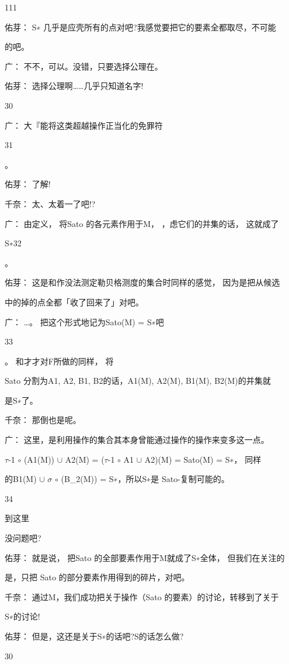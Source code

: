 111\par
佑芽： S∗ 几乎是应壳所有的点对吧?我感觉要把它的要素全都取尽，不可能\par
的吧。\par
广： 不不，可以。没错，只要选择公理在。\par
佑芽： 选择公理啊……几乎只知道名字!\par
30\par
广： 大『能将这类超越操作正当化的免罪符\par
31\par
。\par
佑芽： 了解!\par
千奈： 太、太着一了吧!?\par
广： 由定义， 将Sato 的各元素作用于M， ，虑它们的并集的话， 这就成了\par
S∗32\par
。\par
佑芽： 这是和作没法测定勒贝格测度的集合时同样的感觉， 因为是把从候选\par
中的掉的点全都「收了回来了」对吧。\par
广： …。 把这个形式地记为Sato(M) = S∗吧\par
33\par
。 和才才对F所做的同样， 将\par
Sato 分割为A1, A2, B1, B2的话，A1(M), A2(M), B1(M), B2(M)的并集就\par
是S∗了。\par
千奈： 那倒也是呢。\par
广： 这里，是利用操作的集合其本身曾能通过操作的操作来变多这一点。\par
$\tau$-1 $\circ$ (A1(M)) $\cup$ A2(M) = ($\tau$-1 $\circ$ A1 $\cup$ A2)(M) = Sato(M) = S∗， 同样\par
的B1(M) $\cup$ $\sigma$ $\circ$ (B\_2(M)) = S∗，所以S∗是 Sato-复制可能的。\par
34\par
到这里\par
没问题吧?\par
佑芽： 就是说， 把Sato 的全部要素作用于M就成了S∗全体， 但我们在关注的\par
是，只把 Sato 的部分要素作用得到的碎片，对吧。\par
千奈： 通过M，我们成功把关于操作（Sato 的要素）的讨论，转移到了关于\par
S∗的讨论!\par
佑芽： 但是，这还是关于S∗的话吧?S的话怎么做?\par
30\par
